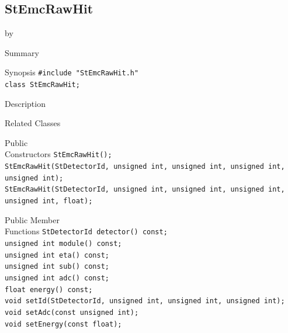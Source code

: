 \documentclass[twoside]{article}
\newcommand{\entrylabel}[1]{\mbox{\textbf{{#1}}}\hfil}%
\newenvironment{entry}
{\begin{list}{}%
    {\renewcommand{\makelabel}{\entrylabel}%
     \setlength{\labelwidth}{90pt}%
     \setlength{\leftmargin}{\labelwidth}
     \advance\leftmargin by \labelsep%
      }%
    }%
  {\end{list}}
\newcommand{\Entrylabel}[1]%
{\raisebox{0pt}[1ex][0pt]{\makebox[\labelwidth][l]%
    {\parbox[t]{\labelwidth}{\hspace{0pt}\textbf{{#1}}}}}}
\newenvironment{Entry}%
{\renewcommand{\entrylabel}{\Entrylabel}\begin{entry}}%
  {\end{entry}}
\begin{document}
\clearpage


\subsection{StEmcRawHit}
\label{sec:StEmcRawHit}
\begin{Entry}
\item[Summary]
\item[Synopsis]
    \verb+#include "StEmcRawHit.h"+\\
    \verb+class StEmcRawHit;+\\
\item[Description]
\item[Related Classes]
\item[Public\\ Constructors]
    \verb+StEmcRawHit();+\\
    \verb+StEmcRawHit(StDetectorId, unsigned int, unsigned int, unsigned int, unsigned int);+\\
    \verb+StEmcRawHit(StDetectorId, unsigned int, unsigned int, unsigned int, unsigned int, float);+\\
\item[Public Member\\ Functions]
    \verb+StDetectorId detector() const;+\\
    \verb+unsigned int module() const;+\\
    \verb+unsigned int eta() const;+\\
    \verb+unsigned int sub() const;+\\
    \verb+unsigned int adc() const;+\\
    \verb+float energy() const;+\\
    \verb+void setId(StDetectorId, unsigned int, unsigned int, unsigned int);+\\
    \verb+void setAdc(const unsigned int);+\\
    \verb+void setEnergy(const float);+\\
\end{Entry}
\clearpage
\end{document}
